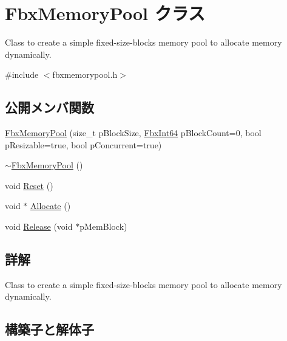 \hypertarget{class_fbx_memory_pool}{}\section{Fbx\+Memory\+Pool クラス}
\label{class_fbx_memory_pool}


Class to create a simple fixed-\/size-\/blocks memory pool to allocate memory dynamically.  




{\ttfamily \#include $<$fbxmemorypool.\+h$>$}

\subsection*{公開メンバ関数}
\begin{DoxyCompactItemize}
\item 
\hyperlink{class_fbx_memory_pool_a588f08af0ec9cb4f1338490d06444d51}{Fbx\+Memory\+Pool} (size\+\_\+t p\+Block\+Size, \hyperlink{fbxtypes_8h_ac7e1334c7c6aacc9c8a9dccddebb4368}{Fbx\+Int64} p\+Block\+Count=0, bool p\+Resizable=true, bool p\+Concurrent=true)
\item 
\hyperlink{class_fbx_memory_pool_a8674dda6c327078479eb19174b75c142}{$\sim$\+Fbx\+Memory\+Pool} ()
\item 
void \hyperlink{class_fbx_memory_pool_a9bd2739def7e1af783a5b97b83c3e8ff}{Reset} ()
\item 
void $\ast$ \hyperlink{class_fbx_memory_pool_aeccd6cbfc4f43a28fa16744a52ea877a}{Allocate} ()
\item 
void \hyperlink{class_fbx_memory_pool_adcac349666eea1d48455cfed673e4144}{Release} (void $\ast$p\+Mem\+Block)
\end{DoxyCompactItemize}


\subsection{詳解}
Class to create a simple fixed-\/size-\/blocks memory pool to allocate memory dynamically. 

\subsection{構築子と解体子}
\mbox{\label{class_fbx_memory_pool_a588f08af0ec9cb4f1338490d06444d51}} 
